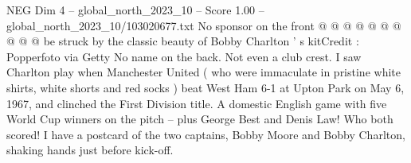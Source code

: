 \begin{textsample}{NEG Dim 4 – global\_north\_2023\_10 – Score 1.00 – global\_north\_2023\_10/103020677.txt}
No sponsor on the front @ @ @ @ @ @ @ @ @ @ be struck by the classic beauty of Bobby Charlton ' s kitCredit : Popperfoto via Getty No name on the back.
Not even a club crest.
I saw Charlton play when Manchester United ( who were immaculate in pristine white shirts, white shorts and red socks ) beat West Ham 6-1 at Upton Park on May 6, 1967, and clinched the First Division title.
A domestic English game with five World Cup winners on the pitch -- plus George Best and Denis Law!
Who both scored!
I have a postcard of the two captains, Bobby Moore and Bobby Charlton, shaking hands just before kick-off.

\end{textsample}

